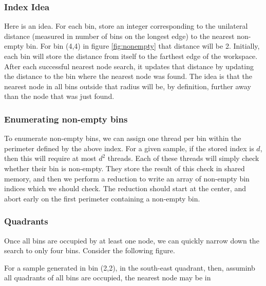 \subsubsection{Index Idea}

Here is an idea. For each bin, store an integer corresponding to the unilateral distance (measured in number of bins on the longest edge) to the nearest non-empty bin. For bin (4,4) in figure \ref{fig:nonempty} that distance will be 2. Initially, each bin will store the distance from itself to the farthest edge of the workspace. After each successful nearest node search, it updates that distance by updating the distance to the bin where the nearest node was found. The idea is that the nearest node in all bins outside that radius will be, by definition, further away than the node that was just found. 

\subsubsection{Enumerating non-empty bins}

To enumerate non-empty bins, we can assign one thread per bin within the perimeter defined by the above index. For a given sample, if the stored index is $d$, then this will require at most $d^2$ threads. Each of these threads will simply check whether their bin is non-empty. They store the result of this check in shared memory, and then we perform a reduction to write an array of non-empty bin indices which we should check. The reduction should start at the center, and abort early on the first perimeter containing
 a non-empty bin.


\subsubsection{Quadrants}

Once all bins are occupied by at least one node, we can quickly narrow down the search to only four bins. Consider the following figure.

\begin{figure}[H]
\begin{centering}
    \texttt{[image: \\figfile\{fig/nonempty\_full\_quad]}}
    \caption{Quandrants}
\end{centering} 
\end{figure}

For a sample generated in bin (2,2), in the south-east quadrant, then, assuminb all quadrants of all bins are occupied, the nearest node may be in 

